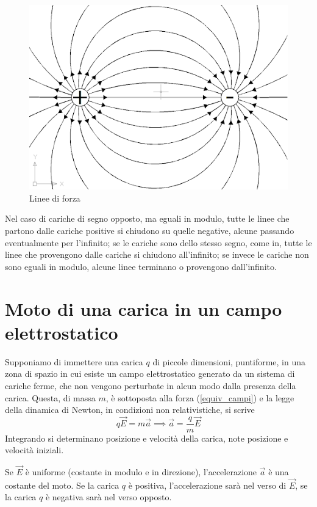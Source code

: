 \documentclass[class=book, crop=false, oneside, 12pt]{standalone}
\begin{document}
\begin{figure}[h]
    \includegraphics[scale=0.4]{linee-di-forza}
    \centering
    \caption{Linee di forza}
\end{figure}

Nel caso di cariche di segno opposto, ma eguali in modulo, tutte le linee che partono dalle cariche positive si chiudono su quelle negative, alcune passando eventualmente per l'infinito; 
se le cariche sono dello stesso segno, come in, tutte le linee che provengono dalle cariche si chiudono all'infinito; 
se invece le cariche non sono eguali in modulo, alcune linee terminano o provengono dall'infinito.

\section{Moto di una carica in un campo elettrostatico}

Supponiamo di immettere una carica \(q\) di piccole dimensioni, puntiforme, in una zona di spazio in cui esiste un campo elettrostatico generato da un sistema di cariche ferme, che non vengono perturbate in alcun modo dalla presenza della carica. 
Questa, di massa \(m\), è sottoposta alla forza (\ref{equiv_campi}) e la legge della dinamica di Newton, in condizioni non relativistiche, si scrive
\begin{equation}
    q \overrightarrow{E} = m \overrightarrow{a} \implies \overrightarrow{a} = \frac{q}{m} \overrightarrow{E}
\end{equation}
Integrando si determinano posizione e velocità della carica, note posizione e velocità iniziali. 

Se \(\overrightarrow{E}\) è uniforme (costante in modulo e in direzione), l'accelerazione \(\overrightarrow{a}\) è una costante del moto. 
Se la carica \(q\) è positiva, l'accelerazione sarà nel verso di \(\overrightarrow{E}\), se la carica \(q\) è negativa sarà nel verso opposto.
\end{document}
